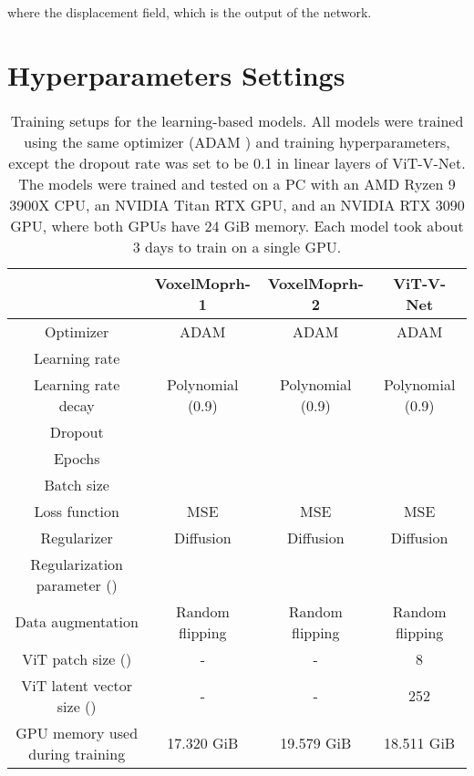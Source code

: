\documentclass{midl}
\begin{document}
where  the displacement field, which is the output of the network.

\section{Hyperparameters Settings}
\label{hyper}
\begin{table}[!hbp]
\centering
\footnotesize
    \begin{tabular}{ c | c c c}
 \hline
  & VoxelMoprh-1 & VoxelMoprh-2 & ViT-V-Net\\
 \hline
 Optimizer & ADAM & ADAM & ADAM \\
 \hline
 Learning rate&  &  & \\
  \hline
 Learning rate decay & Polynomial (0.9) & Polynomial (0.9) & Polynomial (0.9)\\
  \hline
Dropout &  &  & \\
  \hline
 Epochs &  &  & \\
 \hline
 Batch size  &  &  & \\
 \hline
 Loss function & MSE & MSE & MSE \\
 \hline
 Regularizer & Diffusion & Diffusion & Diffusion \\
 \hline
 Regularization parameter ()  &  &  & \\
 \hline
 Data augmentation  & Random flipping & Random flipping & Random flipping\\
 \hline
 ViT patch size ()  & - & - & 8\\
 \hline
 ViT latent vector size ()  & - & - & 252\\
 \hline
 GPU memory used during training  & 17.320 GiB & 19.579 GiB & 18.511 GiB\\
 \hline
\end{tabular}
\captionsetup{justification=centering}
\caption{Training setups for the learning-based models. All models were trained using the same optimizer (ADAM \cite{kingma2014adam}) and training hyperparameters, except the dropout rate was set to be 0.1 in linear layers of ViT-V-Net. The models were trained and tested on a PC with an AMD Ryzen 9 3900X CPU, an NVIDIA Titan RTX GPU, and an NVIDIA RTX 3090 GPU, where both GPUs have 24 GiB memory. Each model took about 3 days to train on a single GPU.}\label{table_hyper}
\end{table}
\end{document}
